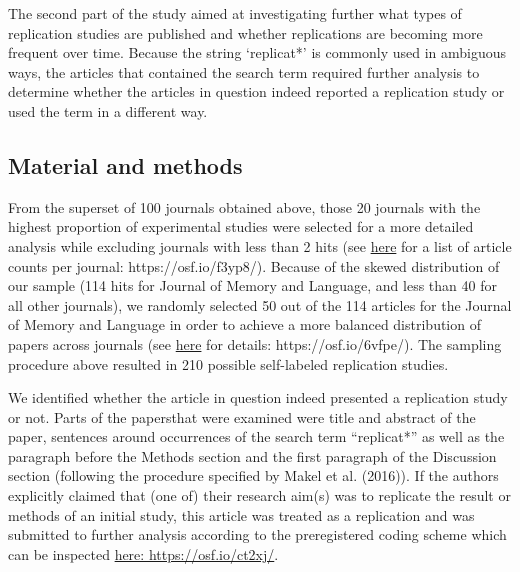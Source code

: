 \documentclass[]{elsarticle} %
\begin{document}
The second part of the study aimed at investigating further what types of replication studies are published and whether replications are becoming more frequent over time.
Because the string `replicat*' is commonly used in ambiguous ways, the articles that contained the search term required further analysis to determine whether the articles in question indeed reported a replication study or used the term in a different way.

\hypertarget{material-and-methods}{%
\subsection{Material and methods}\label{material-and-methods}}

From the superset of 100 journals obtained above, those 20 journals with the highest proportion of experimental studies were selected for a more detailed analysis while excluding journals with less than 2 hits (see \href{https://osf.io/f3yp8/}{here} for a list of article counts per journal: https://osf.io/f3yp8/).
Because of the skewed distribution of our sample (114 hits for Journal of Memory and Language, and less than 40 for all other journals), we randomly selected 50 out of the 114 articles for the Journal of Memory and Language in order to achieve a more balanced distribution of papers across journals (see \href{https://osf.io/6vfpe/}{here} for details: https://osf.io/6vfpe/).
The sampling procedure above resulted in 210 possible self-labeled replication studies.

We identified whether the article in question indeed presented a replication study or not.
Parts of the papersthat were examined were title and abstract of the paper, sentences around occurrences of the search term ``replicat*'' as well as the paragraph before the Methods section and the first paragraph of the Discussion section (following the procedure specified by Makel et al. (2016)).
If the authors explicitly claimed that (one of) their research aim(s) was to replicate the result or methods of an initial study, this article was treated as a replication and was submitted to further analysis according to the preregistered coding scheme which can be inspected \href{https://osf.io/ct2xj/}{here: https://osf.io/ct2xj/}.
\end{document}
